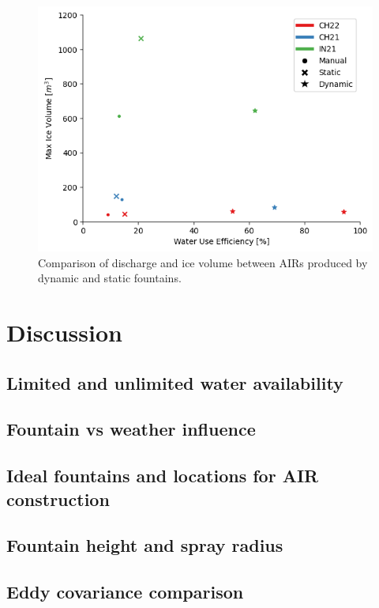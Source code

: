 \documentclass[utf8]{frontiersSCNS}
\begin{document}
\begin{figure}[ht]
	\begin{center}
		\includegraphics[width=\linewidth]{Figures/wue.png}
	\end{center}
	\caption{Comparison of discharge and ice volume between AIRs produced by dynamic and static fountains. }
	\label{fig:old_icestupa}
\end{figure}

\section{Discussion}
\subsection{Limited and unlimited water availability}

\subsection{Fountain vs weather influence}

\subsection{Ideal fountains and locations for AIR construction}

\subsection{Fountain height and spray radius}

\subsection{Eddy covariance comparison}
\end{document}
